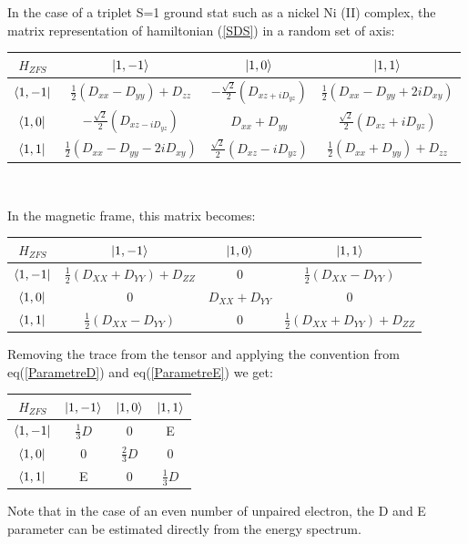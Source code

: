 \documentclass[10pt]{report}
\numberwithin{equation}{section}
\begin{document}
In the case of a triplet S=1 ground stat such as a nickel Ni (II) complex, the matrix representation of hamiltonian (\ref{SDS}) in a random set of axis:
\begin{center}
    \begin{tabular}{ c | c c c}
        $H_{ZFS}$ & $\ket{1,-1}$ & $\ket{1,0} $& $\ket{1,1}$ \\
        \hline
        $\bra{1,-1} $&  $\frac{1}{2}(D_{xx}-D_{yy})+D_{zz}$ & $-\frac{\sqrt{2}}{2}(D_{xz+iD_{yz}}) $ & $\frac{1}{2}(D_{xx}-D_{yy}+2iD_{xy})$ \\
        $\bra{1,0}$ & $-\frac{\sqrt{2}}{2}(D_{xz-iD_{yz}})  $& $ D_{xx}+D_{yy}  $&$ \frac{\sqrt{2}}{2}(D_{xz}+iD_{yz})$ \\
        $\bra{1,1} $& $ \frac{1}{2}(D_{xx}-D_{yy}-2iD_{xy}) $& $\frac{\sqrt{2}}{2}(D_{xz}-iD_{yz})$  & $\frac{1}{2}(D_{xx}+D_{yy})+D_{zz} $ \\
    \end{tabular}\\
\end{center}
In the magnetic frame, this matrix becomes:
\begin{center}
\begin{tabular}{c | c c c}
    $H_{ZFS}$ & $\ket{1,-1}$ & $\ket{1,0} $& $\ket{1,1}$ \\
    \hline
    $\bra{1,-1}$ & $\frac{1}{2}(D_{XX}+D_{YY})+D_{ZZ}$ & 0 & $\frac{1}{2}(D_{XX}-D_{YY})$\\
    $\bra{1,0}$ & 0 & $D_{XX}+D_{YY}$ & 0\\
    $\bra{1,1}$ &  $\frac{1}{2}(D_{XX}-D_{YY})$ & 0 & $\frac{1}{2}(D_{XX}+D_{YY})+D_{ZZ}$
\end{tabular}
\end{center}
Removing the trace from the tensor and applying the convention from eq(\ref{ParametreD}) and eq(\ref{ParametreE}) we get:
\begin{center}
\begin{tabular}{c | c c c}
    $H_{ZFS}$ & $\ket{1,-1}$ & $\ket{1,0}$ & $\ket{1,1}$\\
    \hline
    $\bra{1,-1}$ & $\frac{1}{3}D$ & 0 & E\\
    $\bra{1,0}$ & 0 & $\frac{2}{3}D $& 0\\
    $\bra{1,1}$ & E & 0 & $\frac{1}{3}D$
\end{tabular}
\end{center}
Note that in the case of an even number of unpaired electron, the D and E parameter can be estimated directly from the energy spectrum.
\end{document}
